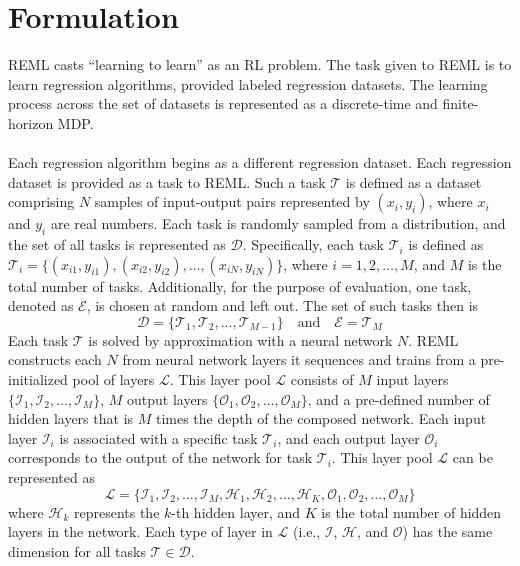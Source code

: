 \section{Formulation}
REML casts ``learning to learn'' as an RL problem. The task given to REML is to 
learn regression algorithms, provided labeled regression datasets. 
The learning process across the set of datasets is represented as a discrete-time 
and finite-horizon MDP.
\\\\
Each regression algorithm begins as a different regression dataset.
Each regression dataset is provided as a task to REML. 
Such a task $\mathcal{T}$ is defined as a dataset comprising $N$ samples of 
input-output pairs represented by $(x_i, y_i)$, where $x_i$ and $y_i$ are 
real numbers. 
Each task is randomly sampled from a distribution, and the set of all tasks is 
represented as $\mathcal{D}$. 
Specifically, each task $\mathcal{T}_i$ is defined as $\mathcal{T}_i = \{(x_{i1}, y_{i1}), (x_{i2}, y_{i2}), \ldots, (x_{iN}, y_{iN})\}$, where \( i = 1, 2, \ldots, M \), and \( M \) is the total number of tasks. 
Additionally, for the purpose of evaluation, one task, denoted as \( \mathcal{E} \), 
is chosen at random and left out. The set of such tasks then is 
\[
    \mathcal{D} = \{\mathcal{T}_1, \mathcal{T}_2, \ldots, \mathcal{T}_{M-1}\} \quad \text{and} \quad \mathcal{E} = \mathcal{T}_M
\]
Each task $\mathcal{T}$ is solved by approximation with a neural network $N$. 
REML constructs each $N$ from neural network layers it sequences and trains from 
a pre-initialized pool of layers $\mathcal{L}$.
This layer pool $\mathcal{L}$ consists of $M$ input layers
$\{ \mathcal{I}_1, \mathcal{I}_2, \ldots, \mathcal{I}_M \}$, $M$ 
output layers $\{ \mathcal{O}_1, \mathcal{O}_2, \ldots, \mathcal{O}_M \}$, and 
a pre-defined number of hidden layers that is $M$ times the depth of the composed
network. 
Each input layer $\mathcal{I}_i$ is associated with a specific task $\mathcal{T}_i $, 
and each output layer $\mathcal{O}_i$ corresponds to the output of the network for 
task $\mathcal{T}_i$. This layer pool $ \mathcal{L} $ can be represented as
\[
    \mathcal{L} = \{\mathcal{I}_1, \mathcal{I}_2, \ldots, \mathcal{I}_M, \mathcal{H}_1, \mathcal{H}_2, \ldots, \mathcal{H}_K, \mathcal{O}_1, \mathcal{O}_2, \ldots, \mathcal{O}_M\}
\]
where $\mathcal{H}_k$ represents the $k$-th hidden layer, and $K$ is the total 
number of hidden layers in the network. 
Each type of layer in $\mathcal{L}$ (i.e., $\mathcal{I}$, $\mathcal{H}$, and 
$\mathcal{O}$) has the same dimension for all tasks $\mathcal{T} \in \mathcal{D}$. 

